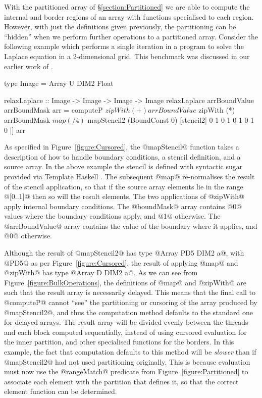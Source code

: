 With the partitioned array of \S\ref{section:Partitioned} we are able to compute the internal and border regions of an array with functions specialised to each region. However, with just the definitions given previously, the partitioning can be ``hidden'' when we perform further operations to a partitioned array. Consider the following example which performs a single iteration in a program to solve the Laplace equation in a 2-dimensional grid. This benchmark was discussed in our earlier work of \cite{Lippmeier:Stencil}.
%
\par 
\begin{small}
\begin{code}
 type Image = Array U DIM2 Float
 
 relaxLaplace :: Image -> Image -> Image -> Image
 relaxLaplace arrBoundValue arrBoundMask arr
  = computeP  $ zipWith (+) arrBoundValue
              $ zipWith (*) arrBoundMask
              $ map (/ 4)
              $ mapStencil2 (BoundConst 0)
                [stencil2| 0 1 0
                           1 0 1 
                           0 1 0 |] arr
\end{code}
\end{small}
\par
%
As specified in Figure~\ref{figure:Cursored}, the @mapStencil@ function takes a description of how to handle boundary conditions, a stencil definition, and a source array. In the above example the stencil is defined with syntactic sugar provided via Template Haskell \cite{Lippmeier:Stencil}. The subsequent @map@ re-normalises the result of the stencil application, so that if the source array elements lie in the range @[0..1]@ then so will the result elements. The two applications of @zipWith@ apply internal boundary conditions. The @boundMask@ array contains @0@ values where the boundary conditions apply, and @1@ otherwise. The @arrBoundValue@ array contains the value of the boundary where it applies, and @0@ otherwise.

Although the result of @mapStencil2@ has type @Array PD5 DIM2 a@, with @PD5@ as per Figure~\ref{figure:Cursored}, the result of applying @map@ and @zipWith@ has type @Array D DIM2 a@. As we can see from Figure~\ref{figure:BulkOperations}, the definitions of @map@ and @zipWith@ are such that the result array is necessarily delayed. This means that the final call to @computeP@ cannot ``see'' the partitioning or cursoring of the array produced by @mapStencil2@, and thus the computation method defaults to the standard one for delayed arrays. The result array will be divided evenly between the threads and each block computed sequentially, instead of using cursored evaluation for the inner partition, and other specialised functions for the borders. In this example, the fact that computation defaults to this method will be \emph{slower} than if @mapStencil2@ had not used partitioning originally. This is because evaluation must now use the @rangeMatch@ predicate from Figure~\ref{figure:Partitioned} to associate each element with the partition that defines it, so that the correct element function can be determined.

